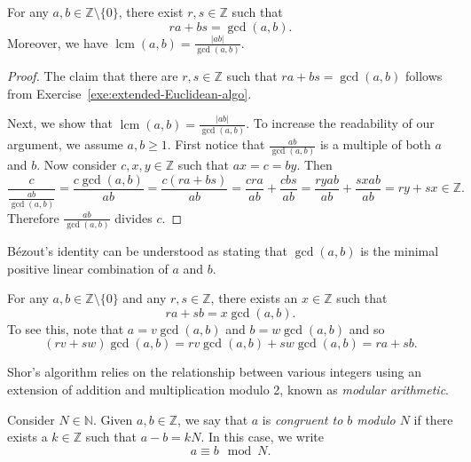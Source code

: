 \documentclass[a4paper, oneside, 12pt]{amsart}
\DeclareMathOperator{\lcm}{lcm}
\begin{document}
\begin{lemma}\label{lem:bezouts-identity}
  For any \( a, b \in \mathbb{Z} \setminus \{0\} \), there exist \( r, s \in \mathbb{Z} \) such that
  \begin{equation}
    ra + bs = \gcd(a, b).
  \end{equation}
  Moreover, we have \(\lcm(a, b) = \frac{|ab|}{\gcd(a, b)}\).
\end{lemma}
\begin{proof}
  The claim that there are \( r, s \in \mathbb{Z}\) such that \( ra + bs = \gcd(a, b) \) follows from Exercise~\ref{exe:extended-Euclidean-algo}.

  Next, we show that \(\lcm(a, b) = \frac{|ab|}{\gcd(a, b)}\).
  To increase the readability of our argument, we assume \(a,b\geq 1\).
  First notice that \( \frac{ab}{\gcd(a, b)} \) is a multiple of both \( a \) and \( b \).
  Now consider \(c,x,y \in \mathbb{Z}\) such that \(ax = c = by\).
  Then
  \begin{equation*}
    \frac{c}{\frac{ab}{\gcd(a,b)}}
    = \frac{c \gcd(a,b)}{ab}
    = \frac{c(ra + bs)}{ab}
    = \frac{cra}{ab} + \frac{cbs}{ab}
    = \frac{ryab}{ab} + \frac{sxab}{ab}
    = ry + sx \in \mathbb{Z}.
  \end{equation*}
  Therefore \(\frac{ab}{\gcd(a,b)}\) divides \(c\).
\end{proof}

Bézout's identity can be understood as stating that \( \gcd(a, b) \) is the minimal positive linear combination of \( a \) and \( b \).

\begin{remark}\label{rmk:linear-combs-and-the-gcd}
  For any \( a, b \in \mathbb{Z} \setminus \{0\} \) and any \( r, s \in \mathbb{Z} \), there exists an \( x \in \mathbb{Z} \) such that
  \begin{equation*}
    ra + sb = x \gcd(a, b).
  \end{equation*}
  To see this, note that \(a = v\gcd(a,b)\) and \(b = w\gcd(a,b)\) and so
  \begin{equation*}
    (rv + sw) \gcd(a,b) = rv\gcd(a,b) + sw \gcd(a,b) = ra + sb.
  \end{equation*}
\end{remark}

Shor's algorithm relies on the relationship between various integers using an extension of addition and multiplication modulo 2, known as \emph{modular arithmetic}.

\begin{definition}\label{def:congruence}
  Consider \( N \in \mathbb{N} \).
  Given \( a, b \in \mathbb{Z} \), we say that \( a \) is \emph{congruent to \( b \) modulo \( N \)} if there exists a \( k \in \mathbb{Z} \) such that \(a - b = k N\).
  In this case, we write
  \begin{equation}
    a \equiv b \mod N.
  \end{equation}
\end{definition}
\end{document}
